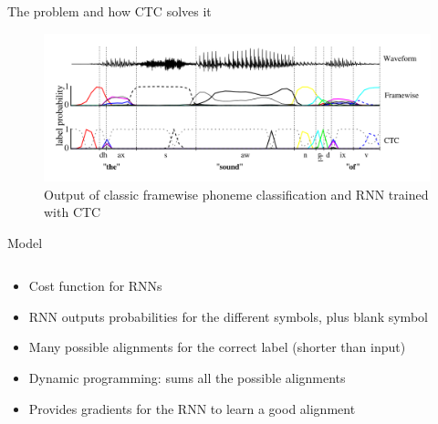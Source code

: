 \documentclass[final]{beamer}
\newlength{\onecolwid}
\newlength{\twocolwid}
\begin{document}
\begin{frame}[t]
\begin{columns}[t]
\begin{column}{\twocolwid}
\begin{alertblock}{The problem and how CTC solves it}
\begin{figure}
\includegraphics[width=0.9\linewidth]{azerty3.png}
\caption{\small Output of classic framewise phoneme classification and RNN trained with CTC}
\end{figure}

\end{alertblock} 



\begin{block}{Model}
\begin{columns}[t,totalwidth=\twocolwid] %


\begin{column}{\onecolwid} %

\begin{itemize}
\item Cost function for RNNs
\item RNN outputs probabilities for the different symbols, plus blank symbol
\item Many possible alignments for the correct label (shorter than input)
\item Dynamic programming: sums all the possible alignments
\item Provides gradients for the RNN to learn a good alignment
\end{itemize}


\end{column}
\end{columns}
\end{block}
\end{column}
\end{columns}
\end{frame}
\end{document}

